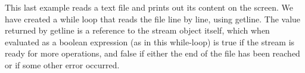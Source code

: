 This last example reads a text file and prints out its content on the screen. We have created a while loop that reads the file line by line, using getline. The value returned by getline is a reference to the stream object itself, which when evaluated as a boolean expression (as in this while-loop) is true if the stream is ready for more operations, and false if either the end of the file has been reached or if some other error occurred.
